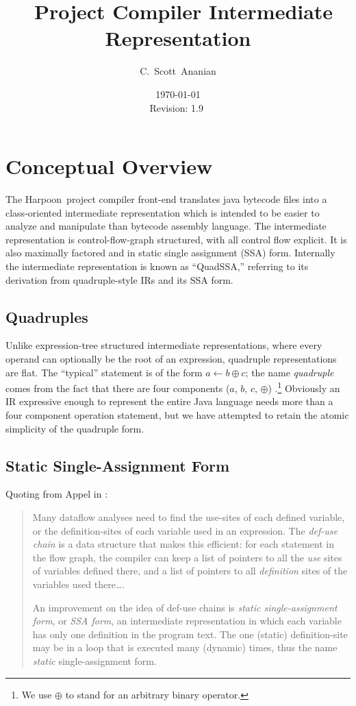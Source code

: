 \documentclass[11pt,notitlepage,twocolumn,twoside]{article}
\author{C.~Scott~Ananian}
\title{\Harpoon\ Project Compiler Intermediate Representation}
\date{\today \\ $ $Revision: 1.9 $ $}
\newcommand{\Harpoon}{Harpoon}%
\begin{document}

\maketitle

\section{Conceptual Overview}

The \Harpoon\ project compiler front-end translates java bytecode files
into a class-oriented intermediate representation which is intended to
be easier to analyze and manipulate than bytecode assembly language.
The intermediate representation is control-flow-graph structured, with
all control flow explicit.  It is also maximally factored and in
static single assignment (SSA) form.  Internally the intermediate
representation is known as ``QuadSSA,'' referring
to its derivation from quadruple-style IRs and its SSA form.

\subsection{Quadruples}
Unlike expression-tree structured intermediate representations, where
every operand can optionally be the root of an expression, quadruple
representations are flat.  The ``typical'' statement is of the form
$a \leftarrow b \oplus c$; the name \textit{quadruple} comes from the fact
that there are four components ($a$, $b$, $c$, $\oplus$)
\cite{appel:modern}.\footnote{We use $\oplus$ to stand for an arbitrary
binary operator.}  Obviously an IR expressive enough to represent the
entire Java language needs more than a four component operation
statement, but we have attempted to retain the atomic simplicity
of the quadruple form.

\subsection{Static Single-Assignment Form}

Quoting from Appel in \cite{appel:modern}:
\begin{quote}
Many dataflow analyses need to find the use-sites of each defined
variable, or the definition-sites of each variable used in an
expression.  The \textit{def-use chain} is a data structure that makes
this efficient: for each statement in the flow graph, the compiler can
keep a list of pointers to all the \textit{use} sites of variables
defined there, and a list of pointers to all \textit{definition} sites
of the variables used there\ldots .

An improvement on the idea of def-use chains is \textit{static
single-assignment form}, or \textit{SSA form}, an intermediate
representation in which each variable has only one definition in the
program text.  The one (static) definition-site may be in a loop that
is executed many (dynamic) times, thus the name \textit{static}
single-assignment form.
\end{quote}
\end{document}
